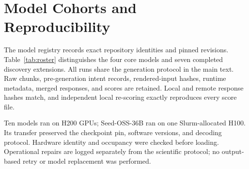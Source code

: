 \section{Model Cohorts and Reproducibility}
\label{app:models}
The model registry records exact repository identities and pinned revisions. Table~\ref{tab:roster} distinguishes the four core models and seven completed discovery extensions. All runs share the generation protocol in the main text. Raw chunks, pre-generation intent records, rendered-input hashes, runtime metadata, merged responses, and scores are retained. Local and remote response hashes match, and independent local re-scoring exactly reproduces every score file.

Ten models ran on H200 GPUs; Seed-OSS-36B ran on one Slurm-allocated H100. Its transfer preserved the checkpoint pin, software versions, and decoding protocol. Hardware identity and occupancy were checked before loading. Operational repairs are logged separately from the scientific protocol; no output-based retry or model replacement was performed.

